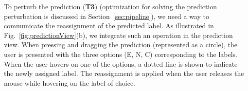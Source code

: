 To perturb the prediction (\textbf{T3}) (optimization for solving the prediction perturbation is discussed in Section~\ref{sec:pipeline}), we need a way to communicate the reassignment of the predicted label. As illustrated in Fig.~\ref{fig:predictionView}(b), we integrate such an operation in the prediction view. When pressing and dragging the prediction (represented as a circle), the user is presented with the three options (E, N, C) corresponding to the labels. When the user hovers on one of the options, a dotted line is shown to indicate the newly assigned label. The reassignment is applied when the user releases the mouse while hovering on the label of choice.
